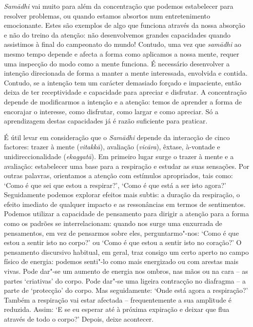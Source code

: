 \emph{Samādhi} vai muito para além da concentração que podemos estabelecer para
resolver problemas, ou quando estamos absortos num entretenimento emocionante.
Estes são exemplos de algo que funciona através da nossa absorção e não do
treino da atenção: não desenvolvemos grandes capacidades quando assistimos à
final do campeonato do mundo! Contudo, uma vez que \emph{samādhi} ao mesmo tempo
depende e afecta a forma como aplicamos a nossa mente, requer uma inspecção do
modo como a mente funciona. É necessário desenvolver a intenção direcionada de
forma a manter a mente interessada, envolvida e contida. Contudo, se a intenção
tem um carácter demasiado forçado e impaciente, então deixa de ter receptividade
e capacidade para apreciar e disfrutar. A concentração depende de modificarmos a
intenção e a atenção: temos de aprender a forma de encorajar o interesse, como
disfrutar, como largar e como apreciar. Só a aprendizagem destas capacidades já
é razão suficiente para praticar.

É útil levar em consideração que o \emph{Samādhi} depende da interacção de cinco
factores: trazer à mente (\emph{vitakkā}), avaliação (\emph{vicāra}), êxtase,
à-vontade e unidireccionalidade (\emph{ekaggatā}). Em primeiro lugar surge o
trazer à mente e a avaliação: estabelecer uma base para a respiração e estudar
as suas sensações. Por outras palavras, orientamos a atenção com estímulos
apropriados, tais como: `Como é que sei que estou a respirar?', `Como é que está
a ser isto agora?' Seguidamente podemos explorar efeitos mais subtis: a duração
da respiração, o efeito imediato de qualquer impacto e as ressonâncias em termos
de sentimentos. Podemos utilizar a capacidade de pensamento para dirigir a
atenção para a forma como os padrões se interrelacionam: quando nos surge uma
enxurrada de pensamentos, em vez de pensarmos sobre eles, perguntarmo"-nos: `Como
é que estou a sentir isto no corpo?' ou `Como é que estou a sentir isto no
coração?' O pensamento discursivo habitual, em geral, traz consigo um certo
aperto no campo físico de energia: podemos senti"-lo como mais energizado ou com
arestas mais vivas. Pode dar"-se um aumento de energia nos ombros, nas mãos ou na
cara -- as partes `criativas' do corpo. Pode dar"-se uma ligeira contracção no
diafragma -- a parte de `protecção' do corpo. Mas seguidamente: `Onde está agora
a respiração?' Também a respiração vai estar afectada -- frequentemente a sua
amplitude é reduzida. Assim: `E se eu esperar até à próxima expiração e deixar
que flua através de todo o corpo?' Depois, deixe acontecer.


